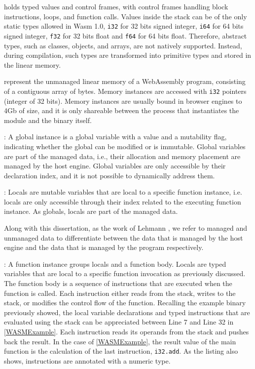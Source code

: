  holds typed values and control frames, with control frames handling block instructions, loops, and function calls.
Values inside the stack can be of the only static types allowed in Wasm 1.0, \texttt{i32} for 32 bits signed integer, \texttt{i64} for 64 bits signed integer, \texttt{f32} for 32 bits float and \texttt{f64} for 64 bits float.
Therefore, abstract types, such as classes, objects, and arrays, are not natively supported. 
Instead, during compilation, such types are transformed into primitive types and stored in the linear memory.

 represent the unmanaged linear memory of a WebAssembly program, consisting of a contiguous array of bytes.
Memory instances are accessed with \texttt{i32} pointers (integer of 32 bits). 
Memory instances are usually bound in browser engines to 4Gb of size, and it is only shareable between the process that instantiates the \Wasm module and the binary itself.

: A global instance is a global variable with a value and a mutability flag, indicating whether the global can be modified or is immutable.
Global variables are part of the managed data, i.e., their allocation and memory placement are managed by the host engine.
Global variables are only accessible by their declaration index, and it is not possible to dynamically address them. 


: Locals are mutable variables that are local to a specific function instance, i.e. locals are only accessible through their index related to the executing function instance. As globals, locals are part of the managed data.

\begin{note}\label{managed_unmanaged}
    Along with this dissertation, as the work of Lehmann \etal \cite{usenixWasm2020}, we refer to managed and unmanaged data to differentiate between the data that is managed by the host engine and the data that is managed by the \Wasm program respectively. 
\end{note}

: 
A function instance groups locals and a function body.
Locals are typed variables that are local to a specific function invocation as previously discussed.
The function body is a sequence of instructions that are executed when the function is called.
Each instruction either reads from the stack, writes to the stack, or modifies the control flow of the function.
Recalling the example \wasm binary previously showed, 
the local variable declarations and typed instructions that are evaluated using the stack can be appreciated between Line 7 and Line 32 in \autoref{WASMExample}. 
Each instruction reads its operands from the stack and pushes back the result. 
In the case of \autoref{WASMExample}, the result value of the main function is the calculation of the last instruction, \texttt{i32.add}. 
As the listing also shows, instructions are annotated with a numeric type.


